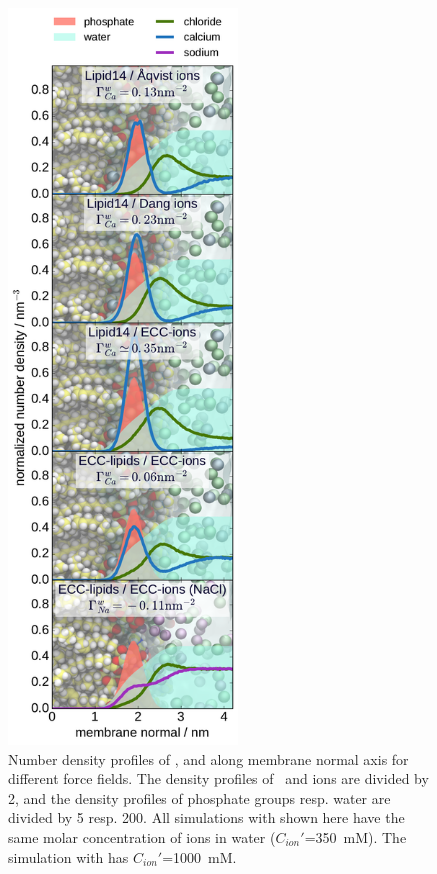 \documentclass[aip,jcp,twocolumn]{revtex4}
\begin{document}
\begin{figure}[htbp!]
  \centering
  \includegraphics[height=19.5cm]{../Fig/ipython_nb/density_profiles_ca_cl_wat_phos_models-compar.pdf}
  \caption{\label{fig:cacl-dens}
    Number density profiles of ,  and  along membrane normal axis
    for different force fields.
    The density profiles of~ and  ions are divided by 2, and
    the density profiles of phosphate groups resp. water are divided by 5 resp. 200. 
    All simulations with  shown here have the same molar concentration of ions in water ($C_{ion}'$=350~mM).
    The simulation with  has $C_{ion}'$=1000~mM.
    }
\end{figure}
\end{document}
